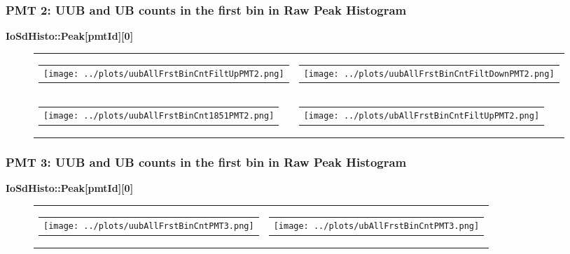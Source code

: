 \documentclass[aspectratio=169]{beamer}
\begin{document}
\begin{frame}
	\frametitle{PMT 2: UUB and UB counts in the first bin in Raw Peak Histogram}
	{\bf IoSdHisto::Peak[pmtId][0]}
	\begin{figure}
		\centering
		\begin{tabularx}{\textwidth}{CC}
			\begin{tabular}{l}
				\texttt{[image: ../plots/uubAllFrstBinCntFiltUpPMT2.png]}
			\end{tabular}
			&
			\begin{tabular}{l}
				\texttt{[image: ../plots/uubAllFrstBinCntFiltDownPMT2.png]}
			\end{tabular}
			\\
			\begin{tabular}{l}
				\texttt{[image: ../plots/uubAllFrstBinCnt1851PMT2.png]}
			\end{tabular}
			& 
			\begin{tabular}{l}
				\texttt{[image: ../plots/ubAllFrstBinCntFiltUpPMT2.png]}
			\end{tabular}
		\end{tabularx}
	\end{figure}
\end{frame}


\begin{frame}
	\frametitle{PMT 3: UUB and UB counts in the first bin in Raw Peak Histogram}
	{\bf IoSdHisto::Peak[pmtId][0]}
	\begin{figure}
		\centering
		\begin{tabularx}{\textwidth}{CC}
			\begin{tabular}{l}
				\texttt{[image: ../plots/uubAllFrstBinCntPMT3.png]}
			\end{tabular}
			&
			\begin{tabular}{l}
				\texttt{[image: ../plots/ubAllFrstBinCntPMT3.png]}
			\end{tabular}
		\end{tabularx}
	\end{figure}
\end{frame}
\end{document}

